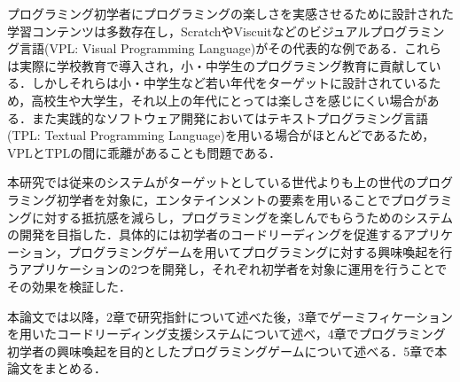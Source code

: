 プログラミング初学者にプログラミングの楽しさを実感させるために設計された学習コンテンツは多数存在し，ScratchやViscuitなどのビジュアルプログラミング言語(VPL: Visual Programming Language)がその代表的な例である．これらは実際に学校教育で導入され，小・中学生のプログラミング教育に貢献している．しかしそれらは小・中学生など若い年代をターゲットに設計されているため，高校生や大学生，それ以上の年代にとっては楽しさを感じにくい場合がある．また実践的なソフトウェア開発においてはテキストプログラミング言語(TPL: Textual Programming Language)を用いる場合がほとんどであるため，VPLとTPLの間に乖離があることも問題である．

本研究では従来のシステムがターゲットとしている世代よりも上の世代のプログラミング初学者を対象に，エンタテインメントの要素を用いることでプログラミングに対する抵抗感を減らし，プログラミングを楽しんでもらうためのシステムの開発を目指した．具体的には初学者のコードリーディングを促進するアプリケーション，プログラミングゲームを用いてプログラミングに対する興味喚起を行うアプリケーションの2つを開発し，それぞれ初学者を対象に運用を行うことでその効果を検証した．


本論文では以降，2章で研究指針について述べた後，3章でゲーミフィケーションを用いたコードリーディング支援システムについて述べ，4章でプログラミング初学者の興味喚起を目的としたプログラミングゲームについて述べる．5章で本論文をまとめる．
